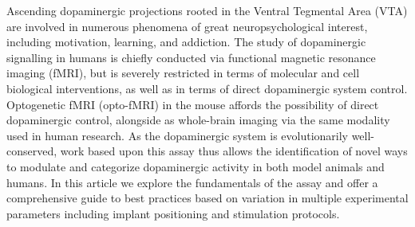 Ascending dopaminergic projections rooted in the Ventral Tegmental Area (VTA) are involved in numerous phenomena of great neuropsychological interest, including motivation, learning, and addiction.
The study of dopaminergic signalling in humans is chiefly conducted via functional magnetic resonance imaging (fMRI), but is severely restricted in terms of molecular and cell biological interventions, as well as in terms of direct dopaminergic system control.
Optogenetic fMRI (opto-fMRI) in the mouse affords the possibility of direct dopaminergic control, alongside as whole-brain imaging via the same modality used in human research.
As the dopaminergic system is evolutionarily well-conserved, work based upon this assay thus allows the identification of novel ways to modulate and categorize dopaminergic activity in both model animals and humans.
In this article we explore the fundamentals of the assay and offer a comprehensive guide to best practices based on variation in multiple experimental parameters including implant positioning and stimulation protocols.
